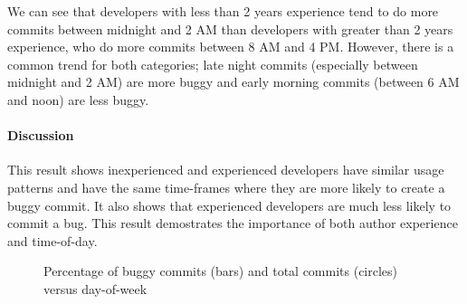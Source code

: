We can see that developers with less than 2 years experience tend to do more
commits between midnight and 2 AM than developers with greater than 2 years
experience, who do more commits between 8 AM and 4 PM. However, there is a
common trend for both categories; late night commits (especially between
midnight and 2 AM) are more buggy and early morning commits (between 6 AM and
noon) are less buggy.

\paragraph{Discussion}

This result shows inexperienced and experienced developers have similar usage
patterns and have the same time-frames where they are more likely to create a
buggy commit. It also shows that experienced developers are much less likely to
commit a bug.  This result demostrates the importance of both author experience
and time-of-day.

\begin{figure}[tbh]
\centering
{}
\caption{\label{fig-bugginess-day}Percentage of buggy commits (bars) and total
  commits (circles) versus day-of-week}
\end{figure}

